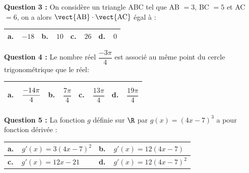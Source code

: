 \textbf{Question 3 :} On considère un triangle ABC tel que AB $= 3$, BC $= 5$ et AC $= 6$, on a alors $\vect{\text{AB}} \cdot \vect{\text{AC}}$ égal à :

\begin{center}
\begin{tabularx}{\linewidth}{|*{4}{X|}}\hline
\textbf{a.~~}$-18$&\textbf{b.~~}$10$&\textbf{c.~~}$26$&\textbf{d.~~}$0$\\ \hline
\end{tabularx}
\end{center}

\textbf{Question 4 :} Le nombre réel $\dfrac{- 3\pi}{4} $ est associé au même point du cercle trigonométrique que le réel:

\begin{center}
\begin{tabularx}{\linewidth}{|*{4}{X|}}\hline
\textbf{a.~~}$\dfrac{- 14\pi\rule{0pt}{12pt}}{4\rule[-5pt]{0pt}{0pt}}$&\textbf{b.~~}$\dfrac{7\pi}{4}$&\textbf{c.~~}$\dfrac{13\pi}{4}$&\textbf{d.~~}$\dfrac{19\pi}{4}$\\ \hline
\end{tabularx}
\end{center}

\textbf{Question 5 :} La fonction $g$ définie sur $\R$ par $g(x) = (4x - 7)^3$ a pour fonction dérivée :

\begin{center}
\begin{tabularx}{\linewidth}{|*{2}{X|}}\hline
\textbf{a.~~}$g'(x) = 3(4x - 7)^2$&\textbf{b.~~}$g'(x) = 12(4x - 7)$\\ \hline
\textbf{c.~~}$g'(x) = 12x - 21$&\textbf{d.~~}$g'(x) =  12(4x - 7)^2$\\ \hline
\end{tabularx}
\end{center}

\bigskip
